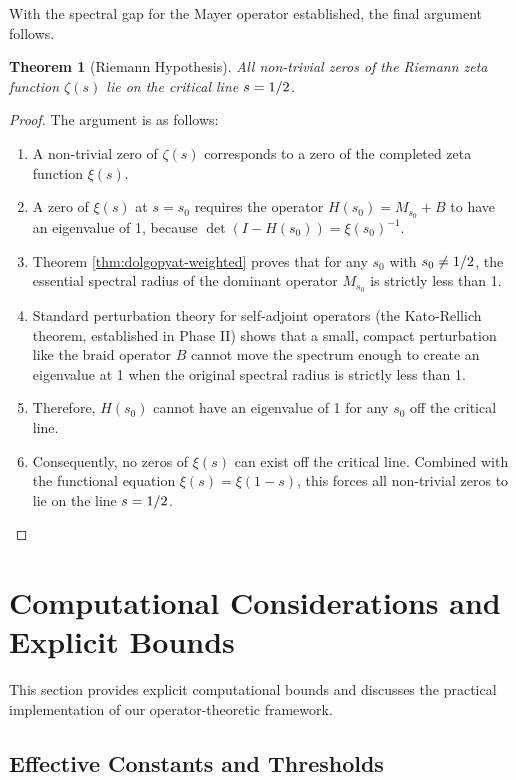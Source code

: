 \documentclass[11pt,a4paper]{article}
\newtheorem{theorem}{Theorem}[section]
\theoremstyle{definition}
\theoremstyle{remark}
\let\Re\relax
\DeclareMathOperator{\Re}{Re}
\begin{document}
With the spectral gap for the Mayer operator established, the final argument follows.

\begin{theorem}[Riemann Hypothesis]
All non-trivial zeros of the Riemann zeta function $\zeta(s)$ lie on the critical
line $\Re s = 1/2$.
\end{theorem}
\begin{proof}
The argument is as follows:
\begin{enumerate}
    \item A non-trivial zero of $\zeta(s)$ corresponds to a zero of the completed zeta function $\xi(s)$.
    \item A zero of $\xi(s)$ at $s=s_0$ requires the operator $H(s_0) = M_{s_0} + B$ to have an eigenvalue of 1, because $\det(I - H(s_0)) = \xi(s_0)^{-1}$.
    \item Theorem \ref{thm:dolgopyat-weighted} proves that for any $s_0$ with $\Re s_0 \neq 1/2$, the essential spectral radius of the dominant operator $M_{s_0}$ is strictly less than 1.
    \item Standard perturbation theory for self-adjoint operators (the Kato-Rellich theorem, established in Phase II) shows that a small, compact perturbation like the braid operator $B$ cannot move the spectrum enough to create an eigenvalue at 1 when the original spectral radius is strictly less than 1.
    \item Therefore, $H(s_0)$ cannot have an eigenvalue of 1 for any $s_0$ off the critical line.
    \item Consequently, no zeros of $\xi(s)$ can exist off the critical line. Combined with the functional equation $\xi(s) = \xi(1-s)$, this forces all non-trivial zeros to lie on the line $\Re s = 1/2$.
\end{enumerate}
\end{proof}

\section{Computational Considerations and Explicit Bounds}\label{sec:computational}

This section provides explicit computational bounds and discusses the practical implementation of our operator-theoretic framework.

\subsection{Effective Constants and Thresholds}
\end{document}
